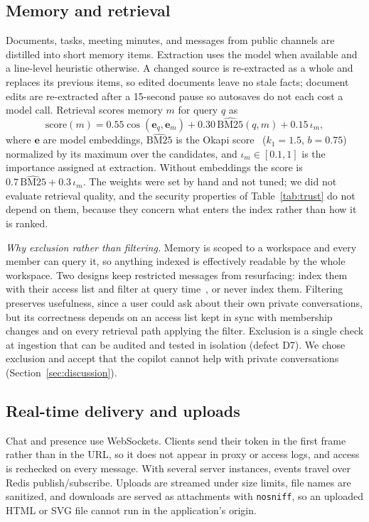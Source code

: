\documentclass[conference]{IEEEtran}
\begin{document}
\subsection{Memory and retrieval}
Documents, tasks, meeting minutes, and messages from public channels are distilled into short memory items. Extraction uses the model when available and a line-level heuristic otherwise. A changed source is re-extracted as a whole and replaces its previous items, so edited documents leave no stale facts; document edits are re-extracted after a 15-second pause so autosaves do not each cost a model call. Retrieval scores memory $m$ for query $q$ as
\begin{equation}
\mathrm{score}(m) = 0.55\cos(\mathbf{e}_q, \mathbf{e}_m) + 0.30\,\widehat{\mathrm{BM25}}(q, m) + 0.15\,\iota_m,
\end{equation}
where $\mathbf{e}$ are model embeddings, $\widehat{\mathrm{BM25}}$ is the Okapi score~\cite{robertson2009bm25} ($k_1{=}1.5$, $b{=}0.75$) normalized by its maximum over the candidates, and $\iota_m \in [0.1, 1]$ is the importance assigned at extraction. Without embeddings the score is $0.7\,\widehat{\mathrm{BM25}} + 0.3\,\iota_m$. The weights were set by hand and not tuned; we did not evaluate retrieval quality, and the security properties of Table~\ref{tab:trust} do not depend on them, because they concern what enters the index rather than how it is ranked.

\textit{Why exclusion rather than filtering.} Memory is scoped to a workspace and every member can query it, so anything indexed is effectively readable by the whole workspace. Two designs keep restricted messages from resurfacing: index them with their access list and filter at query time~\cite{jeong2025permission}, or never index them. Filtering preserves usefulness, since a user could ask about their own private conversations, but its correctness depends on an access list kept in sync with membership changes and on every retrieval path applying the filter. Exclusion is a single check at ingestion that can be audited and tested in isolation (defect D7). We chose exclusion and accept that the copilot cannot help with private conversations (Section~\ref{sec:discussion}).

\subsection{Real-time delivery and uploads}
Chat and presence use WebSockets. Clients send their token in the first frame rather than in the URL, so it does not appear in proxy or access logs, and access is rechecked on every message. With several server instances, events travel over Redis publish/subscribe. Uploads are streamed under size limits, file names are sanitized, and downloads are served as attachments with \texttt{nosniff}, so an uploaded HTML or SVG file cannot run in the application's origin.
\end{document}
